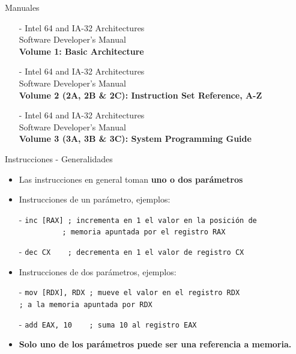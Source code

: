 \documentclass[aspectratio=169]{beamer}
\begin{document}
\begin{frame}[fragile]{Manuales}
    \begin{itemize}
    \setlength\itemsep{1cm}
    \item[-] Intel 64 and IA-32 Architectures\\
    Software Developer's Manual\\
    \textbf{Volume 1: Basic Architecture}
    \item[-] Intel 64 and IA-32 Architectures\\
    Software Developer's Manual\\
    \textbf{Volume 2 (2A, 2B \& 2C): Instruction Set Reference, A-Z}
    \item[-] Intel 64 and IA-32 Architectures\\
    Software Developer's Manual\\
    \textbf{Volume 3 (3A, 3B \& 3C): System Programming Guide}
    \end{itemize}
\end{frame}

\begin{frame}[t,fragile]{Instrucciones - Generalidades}
    \begin{itemize}
    \setlength\itemsep{0.6cm}
    \item Las instrucciones en general toman \textbf{uno o dos parámetros}
    \pause
    \item Instrucciones de un parámetro, ejemplos:
    \end{itemize}
    \begin{itemize}
    \item[-] \verb|inc [RAX] ; incrementa en 1 el valor en la posición de|\\
            \verb|          ; memoria apuntada por el registro RAX|
    \item[-] \verb|dec CX    ; decrementa en 1 el valor de registro CX|
    \end{itemize}
    \pause
    \begin{itemize}
    \setlength\itemsep{0.6cm}
    \item Instrucciones de dos parámetros, ejemplos:
    \end{itemize}
    \begin{itemize}
    \item[-] \verb|mov [RDX], RDX ; mueve el valor en el registro RDX |\\
            \hspace{2.88cm}\verb|; a la memoria apuntada por RDX|
    \item[-] \verb|add EAX, 10    ; suma 10 al registro EAX|
    \end{itemize}
    \pause
    \begin{itemize}
    \setlength\itemsep{0.6cm}
    \item \textbf{Solo uno de los parámetros puede ser una referencia a memoria.}
    \end{itemize}
\end{frame}
\end{document}
